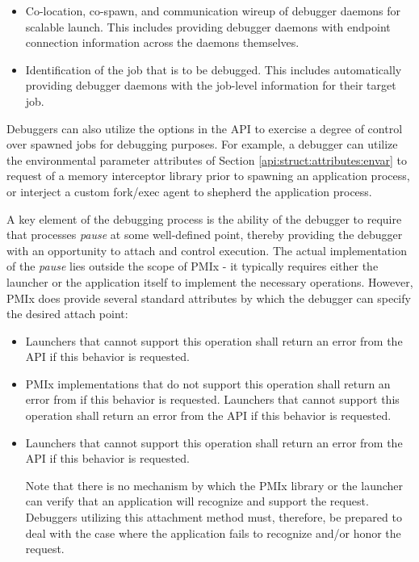 \begin{itemize}
    \item Co-location, co-spawn, and communication wireup of debugger daemons for scalable launch. This includes providing debugger daemons with endpoint connection information across the daemons themselves.
    \item Identification of the job that is to be debugged. This includes automatically providing debugger daemons with the job-level information for their target job.
\end{itemize}

Debuggers can also utilize the options in the  \ac{API} to exercise a degree of control over spawned jobs for debugging purposes. For example, a debugger can utilize the environmental parameter attributes of Section \ref{api:struct:attributes:envar} to request  of a memory interceptor library prior to spawning an application process, or interject a custom fork/exec agent to shepherd the application process.

A key element of the debugging process is the ability of the debugger to require that processes \emph{pause} at some well-defined point, thereby providing the debugger with an opportunity to attach and control execution. The actual implementation of the \emph{pause} lies outside the scope of \ac{PMIx} - it typically requires either the launcher or the application itself to implement the necessary operations. However, \ac{PMIx} does provide several standard attributes by which the debugger can specify the desired attach point:

\begin{itemize}
    \item {}Launchers that cannot support this operation shall return an error from the  \ac{API} if this behavior is requested.
    \pasteAttributeItemEnd{}
    \item {}\ac{PMIx} implementations that do not support this operation shall return an error from  if this behavior is requested. Launchers that cannot support this operation shall return an error from the  \ac{API} if this behavior is requested.
    \pasteAttributeItemEnd{}
    \item {}Launchers that cannot support this operation shall return an error from the  \ac{API} if this behavior is requested.

    Note that there is no mechanism by which the \ac{PMIx} library or the launcher can verify that an application will recognize and support the  request. Debuggers utilizing this attachment method must, therefore, be prepared to deal with the case where the application fails to recognize and/or honor the request.
    \pasteAttributeItemEnd{}
\end{itemize}


